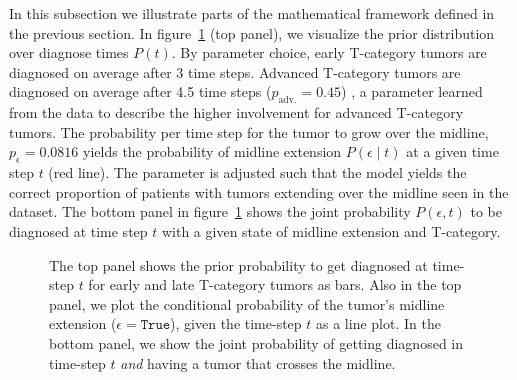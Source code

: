 \documentclass[
  sn-mathphys-num,
]{sn-jnl}
\begin{document}
In this subsection we illustrate parts of the mathematical framework
defined in the previous section. In figure~\ref{fig-model-midext-evo}
(top panel), we visualize the prior distribution over diagnose times
\(P(t)\). By parameter choice, early T-category tumors are diagnosed on
average after 3 time steps. Advanced T-category tumors are diagnosed on
average after 4.5 time steps (\(p_\text{adv.}=0.45\)) , a parameter
learned from the data to describe the higher involvement for advanced
T-category tumors. The probability per time step for the tumor to grow
over the midline, \(p_\epsilon = 0.0816\) yields the probability of
midline extension \(P(\epsilon \mid t)\) at a given time step \(t\) (red
line). The parameter is adjusted such that the model yields the correct
proportion of patients with tumors extending over the midline seen in
the dataset. The bottom panel in figure~\ref{fig-model-midext-evo} shows
the joint probability \(P(\epsilon, t)\) to be diagnosed at time step
\(t\) with a given state of midline extension and T-category.

\begin{figure}


\caption{\label{fig-model-midext-evo}The top panel shows the prior
probability to get diagnosed at time-step \(t\) for early and late
T-category tumors as bars. Also in the top panel, we plot the
conditional probability of the tumor's midline extension
(\(\epsilon=\texttt{True}\)), given the time-step \(t\) as a line plot.
In the bottom panel, we show the joint probability of getting diagnosed
in time-step \(t\) \emph{and} having a tumor that crosses the midline.}

\end{figure}%
\end{document}
